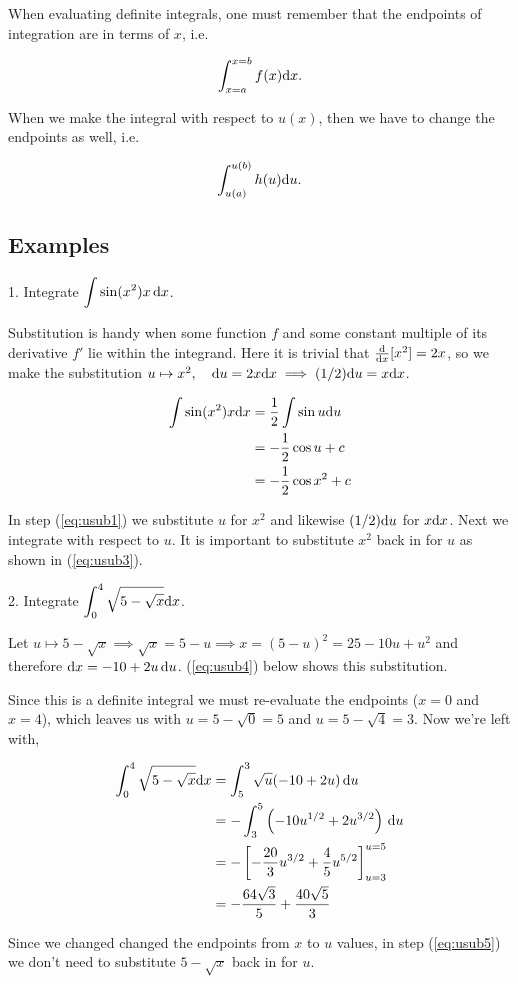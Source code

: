 When evaluating definite integrals, one must remember that the endpoints of integration are in terms of $x$, i.e.

$$ \int_{x=a}^{x=b} f(x)\textrm{d}x. $$

When we make the integral with respect to $u(x)$, then we have to change the endpoints as well, i.e.

$$ \int_{u(a)}^{u(b)} h(u) \textrm{d}u. $$


\subsection*{Examples}

1. Integrate $\displaystyle \int \sin(x^2)x\, \textrm{d}x $.

\begin{ExampleBody}
Substitution is handy when some function $f$ and some constant multiple of its derivative $f'$ lie within the integrand. Here it is trivial that $\frac{\textrm{d}}{\textrm{d}x} [x^2]=2x$, so we make the substitution $u\mapsto x^2, \quad \textrm{d}u = 2x\textrm{d}x \implies (1/2)\textrm{d}u = x \textrm{d}x$.

\begin{align}
    \int \sin (x^2) x \textrm{d}x &= \frac 1 2 \int \sin u \textrm{d}u \label{eq:usub1} \\
    &= -\frac 1 2 \cos u + c \nonumber \\
    &= -\frac 1 2 \cos x^2 + c \label{eq:usub3}
\end{align}

In step (\ref{eq:usub1}) we substitute $u$ for $x^2$ and likewise $(1/2)\textrm{d}u$ for $x \textrm{d}x$. Next we integrate with respect to $u$. It is important to substitute $x^2$ back in for $u$ as shown in (\ref{eq:usub3}).
\end{ExampleBody}

2. Integrate $\displaystyle \int_0^4 \sqrt{5-\sqrt x}\textrm{d}x$.

    \begin{ExampleBody}
    Let $u \mapsto 5-\sqrt x \implies \sqrt x = 5-u \implies x = (5-u)^2 = 25 - 10u + u^2$ and therefore $\textrm{d}x = -10 + 2u \,\textrm{d}u$. (\ref{eq:usub4}) below shows this substitution.
    
    Since this is a definite integral we must re-evaluate the endpoints ($x=0$ and $x=4$), which leaves us with $u=5-\sqrt 0=5$ and $u=5-\sqrt 4 = 3$. Now we're left with,
    
    \begin{align}
        \int_0^4 \sqrt{5-\sqrt x}\textrm{d}x &= \int_5^3 \sqrt u (-10+2u)\,\textrm{d}u \label{eq:usub4} \\
        &= -\int_3^5 \left(-10u^{1/2} + 2u^{3/2}\right)\, \textrm{d}u \nonumber \\
        &= -\left[ -\frac{20}{3}u^{3/2} + \frac{4}{5}u^{5/2} \right]_{u=3}^{u=5} \label{eq:usub5} \\
        &= -\frac{64\sqrt 3}{5} + \frac{40\sqrt 5}{3} \nonumber
    \end{align}
    
    Since we changed changed the endpoints from $x$ to $u$ values, in step (\ref{eq:usub5}) we don't need to substitute $5-\sqrt x$ back in for $u$.
    \end{ExampleBody}
    
